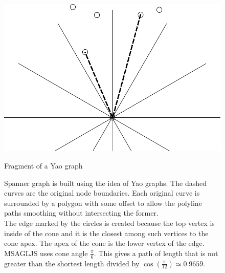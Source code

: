\documentclass{gd-llncs}
\begin{document}
\begin{figure}[]
  \centering
  \begin{minipage}[b]{0.5\textwidth}
    \includegraphics[width=\textwidth]{yao.pdf}
    \caption{\small{Fragment of a Yao graph}}
    \label{fig:yao}
  \end{minipage}

  \vfill
  \begin{minipage}[b]{\textwidth}
    
    \caption{\small{Spanner graph is built using the idea of Yao graphs. The dashed curves are the original node boundaries. Each original curve is surrounded by a polygon with some offset to allow the polyline paths smoothing without intersecting the former. \\
        The edge marked by the circles is created because the top vertex is inside of the cone and it is the closest among such vertices to the cone apex. The apex of the cone is the lower vertex of the edge. \\MSAGLJS uses cone angle $\frac{\pi}{6}$. This gives a path of length that is not greater than the shortest length divided by $\cos(\frac{\pi}{12}) \simeq 0.9659$.}  }
    \label{fig:spanner}
  \end{minipage}

\end{figure}
\end{document}
